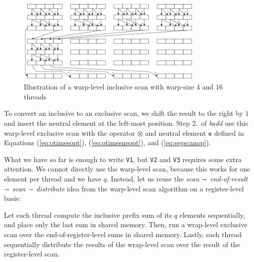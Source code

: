 \begin{figure}
  \centering
  \includegraphics[width=0.8\textwidth]{img/warp-level-scan.png}
  \caption{\footnotesize Illustration of a warp-level inclusive scan with warp-size 4 and 16 threads}
  \label{fig:warpscan}
\end{figure}

To convert an inclusive to an exclusive scan, we shift the result to the right
by $1$ and insert the neutral element at the left-most position. Step 2.\ of
\textit{badd} use this warp-level exclusive scan with the operator $\otimes$ and
neutral element $\mathtt{e}$ defined in Equations (\ref{eq:otimesopt}),
(\ref{eq:otimesneopt}), and (\ref{eq:segscanop}).

What we have so far is enough to write \texttt{V1}, but \texttt{V2} and
\texttt{V3} requires some extra attention. We cannot directly use the warp-level
scan, because this works for one element per thread and we have $q$. Instead,
let us reuse the \textit{scan} $\shortrightarrow$ \textit{end-of-result}
$\shortrightarrow$ \textit{scan} $\shortrightarrow$ \textit{distribute} idea
from the warp-level scan algorithm on a register-level basis:

Let each thread compute the inclusive prefix sum of its $q$ elements
sequentially, and place only the last sum in shared memory. Then, run a
wrap-level exclusive scan over the end-of-register-level sums in shared
memory. Lastly, each thread sequentially distribute the results of the
wrap-level scan over the result of the register-level scan.

